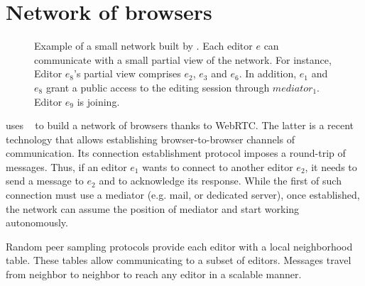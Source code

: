 
\section{Network of browsers}
\label{sec:network}

\begin{figure}
  \centering
  
  \caption{\label{fig:spray} Example of a small network built by \SPRAY. Each
    editor $e$ can communicate with a small partial view of the network. For
    instance, Editor $e_8$'s partial view comprises $e_2$, $e_3$ and $e_6$. In
    addition, $e_1$ and $e_8$ grant a public access to the editing session
    through $mediator_1$. Editor $e_9$ is joining.}
\end{figure}


\CRATE uses \SPRAY~\cite{nedelec2015spray} to build a network of browsers thanks
to WebRTC. The latter is a recent technology that allows establishing
browser-to-browser channels of communication. Its connection establishment
protocol imposes a round-trip of messages. Thus, if an editor $e_1$ wants to
connect to another editor $e_2$, it needs to send a message to $e_2$ and to
acknowledge its response. While the first of such connection must use a mediator
(e.g. mail, or dedicated server), once established, the network can assume the
position of mediator and start working autonomously.

Random peer sampling protocols provide each editor with a local neighborhood
table. These tables allow communicating to a subset of editors. Messages travel
from neighbor to neighbor to reach any editor in a scalable manner.

